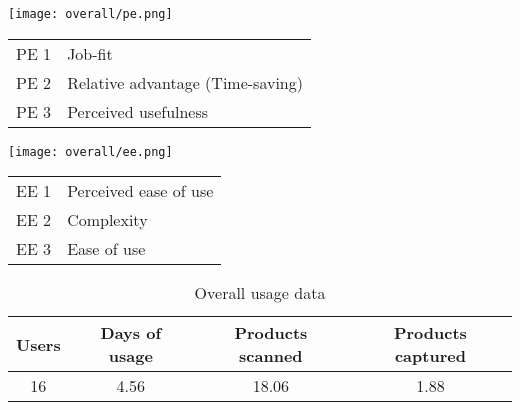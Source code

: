\begin{table}[H]
	\begin{minipage}{9cm}
		\centering
		\texttt{[image: overall/pe.png]}
		 \label{fig:overall-pe}
	\end{minipage}
	\begin{minipage}{4.5cm}
		
		\begin{tabular}{p{1cm} p{3.5cm}}

\toprule
PE 1    &	Job-fit \\
PE 2    &	Relative advantage (Time-saving) \\
PE 3    &	Perceived usefulness \\
\bottomrule

\end{tabular}
	\end{minipage}\hfill

\end{table}


\begin{table}[H]
	\begin{minipage}{9cm}
		\centering
		\texttt{[image: overall/ee.png]}
		 \label{fig:overall-ee}
	\end{minipage}
	\begin{minipage}{4.5cm}
		
		\begin{tabular}{p{1cm} p{3.5cm}}

\toprule
EE 1    &	Perceived ease of use \\
EE 2    &	Complexity \\
EE 3    &	Ease of use \\
\bottomrule

\end{tabular}
	\end{minipage}\hfill

\end{table}


\begin{table}[H]
\centering
\begin{tabular}{|c|c|c|c|}
\hline
Users & Days of usage & Products scanned & Products captured \\ \hline
16    & 4.56          & 18.06            & 1.88              \\ \hline
\end{tabular}
\caption{Overall usage data}
        \label{tab:usage-overall}
\end{table}


